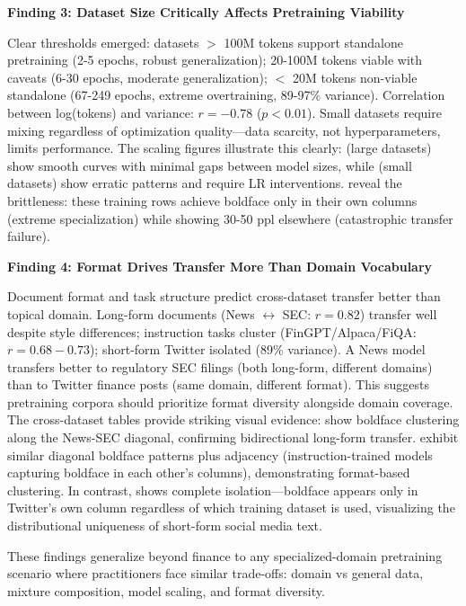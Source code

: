 \textbf{Finding 3: Dataset Size Critically Affects Pretraining Viability}

Clear thresholds emerged: datasets $>$ 100M tokens support standalone pretraining (2-5 epochs, robust generalization); 20-100M tokens viable with caveats (6-30 epochs, moderate generalization); $<$ 20M tokens non-viable standalone (67-249 epochs, extreme overtraining, 89-97\% variance). Correlation between log(tokens) and variance: $r = -0.78$ ($p < 0.01$). Small datasets require mixing regardless of optimization quality—data scarcity, not hyperparameters, limits performance. The scaling figures illustrate this clearly:  (large datasets) show smooth curves with minimal gaps between model sizes, while  (small datasets) show erratic patterns and require LR interventions.  reveal the brittleness: these training rows achieve boldface only in their own columns (extreme specialization) while showing 30-50 ppl elsewhere (catastrophic transfer failure).

\textbf{Finding 4: Format Drives Transfer More Than Domain Vocabulary}

Document format and task structure predict cross-dataset transfer better than topical domain. Long-form documents (News $\leftrightarrow$ SEC: $r = 0.82$) transfer well despite style differences; instruction tasks cluster (FinGPT/Alpaca/FiQA: $r = 0.68-0.73$); short-form Twitter isolated (89\% variance). A News model transfers better to regulatory SEC filings (both long-form, different domains) than to Twitter finance posts (same domain, different format). This suggests pretraining corpora should prioritize format diversity alongside domain coverage. The cross-dataset tables provide striking visual evidence:  show boldface clustering along the News-SEC diagonal, confirming bidirectional long-form transfer.  exhibit similar diagonal boldface patterns plus adjacency (instruction-trained models capturing boldface in each other's columns), demonstrating format-based clustering. In contrast,  shows complete isolation—boldface appears only in Twitter's own column regardless of which training dataset is used, visualizing the distributional uniqueness of short-form social media text.

These findings generalize beyond finance to any specialized-domain pretraining scenario where practitioners face similar trade-offs: domain vs general data, mixture composition, model scaling, and format diversity.

